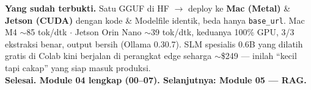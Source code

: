 \documentclass[11pt,a4paper]{article}
\begin{document}
\vspace{6pt}
\begin{tcolorbox}[colback=nvdark,colframe=nvgreen,arc=3pt,left=10pt,right=10pt,top=6pt,bottom=6pt]
\color{white}\textbf{\color{nvlightgreen}Yang sudah terbukti.} Satu GGUF di HF $\to$ deploy ke \textbf{Mac (Metal)} \& \textbf{Jetson (CUDA)} dengan kode \& Modelfile identik, beda hanya \texttt{base\_url}. Mac M4 $\sim$85 tok/dtk $\cdot$ Jetson Orin Nano $\sim$39 tok/dtk, keduanya 100\% GPU, 3/3 ekstraksi benar, output bersih (Ollama 0.30.7). SLM spesialis 0.6B yang dilatih gratis di Colab kini berjalan di perangkat edge seharga $\sim$\$249 --- inilah ``kecil tapi cakap'' yang siap masuk produksi.\\[4pt]
\textbf{Selesai. Module 04 lengkap (00--07). Selanjutnya: Module 05 --- RAG.}
\end{tcolorbox}
\end{document}
